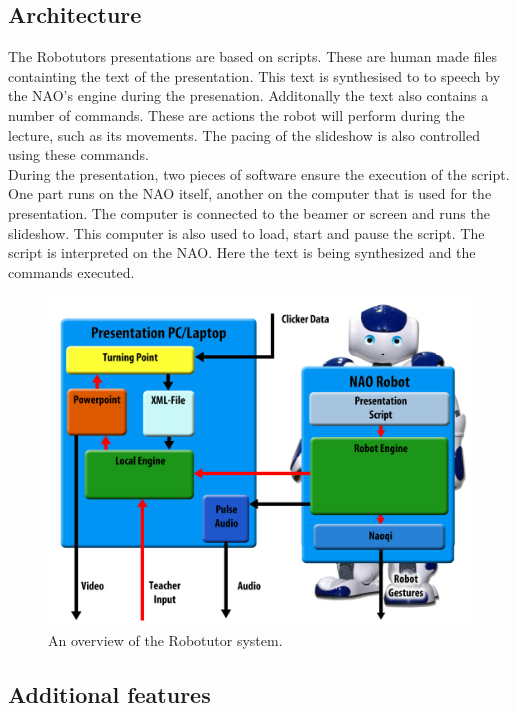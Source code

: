 \subsection{Architecture}
The Robotutors presentations are based on scripts. These are human made files containting the text of the presentation. This text is synthesised to to speech by the NAO's engine during the presenation. Additonally the text also contains a number of commands. These are actions the robot will perform during the lecture, such as its movements. The pacing of the slideshow is also controlled using these commands.\\
During the presentation, two pieces of software ensure the execution of the script. One part runs on the NAO itself, another on the computer that is used for the presentation. The computer is connected to the beamer or screen and runs the slideshow. This computer is also used to load, start and pause the script. The script is interpreted on the NAO. Here the text is being synthesized and the commands executed.

\begin{center}
\begin{figure}[h]
	\includegraphics[scale=0.1]{images/system_overview}
	\caption{An overview of the Robotutor system.}
	\label{fig:system_overview}
\end{figure}
\end{center}

\subsection{Additional features}

